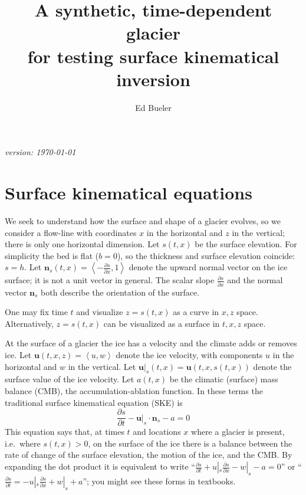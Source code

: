 \documentclass[letterpaper,final,12pt,reqno]{amsart}
\newcommand{\bn}{\mathbf{n}}
\newcommand{\bu}{\mathbf{u}}
\begin{document}

\title{A synthetic, time-dependent glacier \\ for testing surface kinematical inversion}

\author{Ed Bueler}

\maketitle

\begin{center}
{\footnotesize
\emph{version: \today}}
\end{center}

\thispagestyle{empty}

\section{Surface kinematical equations}  We seek to understand how the surface and shape of a glacier evolves, so we consider a flow-line with coordinates $x$ in the horizontal and $z$ in the vertical; there is only one horizontal dimension.  Let $s(t,x)$ be the surface elevation.  For simplicity the bed is flat ($b=0$), so the thickness and surface elevation coincide: $s=h$.  Let $\bn_s(t,x) = \left<-\frac{\partial s}{\partial x},1\right>$ denote the upward normal vector on the ice surface; it is not a unit vector in general.  The scalar slope $\frac{\partial s}{\partial x}$ and the normal vector $\bn_s$ both describe the orientation of the surface.

One may fix time $t$ and visualize $z=s(t,x)$ as a curve in $x,z$ space.  Alternatively, $z=s(t,x)$ can be visualized as a surface in $t,x,z$ space.

At the surface of a glacier the ice has a velocity and the climate adds or removes ice.  Let $\bu(t,x,z)=\left<u,w\right>$ denote the ice velocity, with components $u$ in the horizontal and $w$ in the vertical.  Let $\bu|_s(t,x) = \bu(t,x,s(t,x))$ denote the surface value of the ice velocity.  Let $a(t,x)$ be the climatic (surface) mass balance (CMB), the accumulation-ablation function.  In these terms the traditional surface kinematical equation (SKE) is
\begin{equation}
\frac{\partial s}{\partial t} - \bu|_s \cdot \bn_s - a = 0  \label{ske}
\end{equation}
This equation says that, at times $t$ and locations $x$ where a glacier is present, i.e.~where $s(t,x)>0$, on the surface of the ice there is a balance between the rate of change of the surface elevation, the motion of the ice, and the CMB.  By expanding the dot product it is equivalent to write ``$\frac{\partial s}{\partial t} + u|_s \frac{\partial s}{\partial x} - w|_s - a = 0$'' or ``$\frac{\partial s}{\partial t} = - u|_s \frac{\partial s}{\partial x} + w|_s + a$''; you might see these forms in textbooks.
\end{document}
